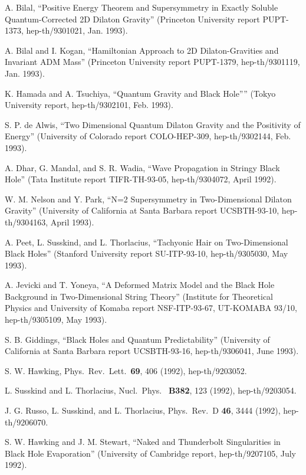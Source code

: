 \documentclass[12pt]{article}
\begin{document}
\begin{thebibliography}{999}
 A. Bilal, ``Positive Energy Theorem and Supersymmetry
in
Exactly Soluble Quantum-Corrected 2D Dilaton Gravity''
(Princeton University report PUPT-1373, hep-th/9301021, Jan. 1993).

 A. Bilal and I. Kogan, ``Hamiltonian Approach to 2D
Dilaton-Gravities
and Invariant ADM Mass'' (Princeton University report PUPT-1379,
hep-th/9301119, Jan. 1993).

 K. Hamada and A. Tsuchiya, ``Quantum Gravity and Black
Hole''''
(Tokyo University report, hep-th/9302101, Feb. 1993).

 S. P. de Alwis, ``Two Dimensional Quantum Dilaton
Gravity and
the Positivity of Energy'' (University of Colorado report
COLO-HEP-309,
hep-th/9302144, Feb. 1993).

 A. Dhar, G. Mandal, and S. R. Wadia, ``Wave
Propagation in
Stringy
Black Hole'' (Tata Institute report TIFR-TH-93-05, hep-th/9304072,
April 1992).

 W. M. Nelson and Y. Park, ``N=2 Supersymmetry in
Two-Dimensional
Dilaton Gravity'' (University of California at Santa Barbara report
UCSBTH-93-10,
hep-th/9304163, April 1993).

 A. Peet, L. Susskind, and L. Thorlacius, ``Tachyonic
Hair on
Two-Dimensional Black Holes'' (Stanford University report
SU-ITP-93-10,
hep-th/9305030, May 1993).

 A. Jevicki and T. Yoneya, ``A Deformed Matrix Model
and
the Black Hole Background in Two-Dimensional String Theory''
(Institute for Theoretical Physics and University of Komaba report
NSF-ITP-93-67, UT-KOMABA 93/10, hep-th/9305109, May 1993).

 S. B. Giddings, ``Black Holes and Quantum
Predictability''
(University of California at Santa Barbara report UCSBTH-93-16,
hep-th/9306041, June 1993).

 S. W. Hawking, Phys.\ Rev.\ Lett.\ {\bf 69}, 406
(1992),
hep-th/9203052.

 L. Susskind and L. Thorlacius, Nucl.\ Phys.\ {\bf
B382}, 123
(1992), hep-th/9203054.

 J. G. Russo, L. Susskind, and L. Thorlacius, Phys.\
Rev.\ D{\bf
46}, 3444 (1992), hep-th/9206070.

 S. W. Hawking and J. M. Stewart, ``Naked and
Thunderbolt
Singularities in Black Hole Evaporation'' (University of Cambridge
report,
hep-th/9207105, July 1992).


\end{thebibliography}
\end{document}
